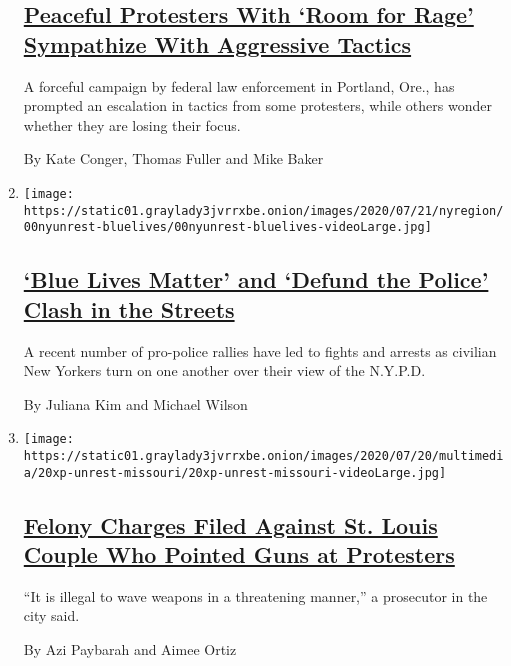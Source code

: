 \begin{enumerate}
  \hypertarget{peaceful-protesters-with-room-for-rage-sympathize-with-aggressive-tactics}{%
  \subsection{\texorpdfstring{\href{/2020/07/27/us/protests-divisions-blm.html}{Peaceful
  Protesters With `Room for Rage' Sympathize With Aggressive
  Tactics}}{Peaceful Protesters With `Room for Rage' Sympathize With Aggressive Tactics}}\label{peaceful-protesters-with-room-for-rage-sympathize-with-aggressive-tactics}}

  A forceful campaign by federal law enforcement in Portland, Ore., has
  prompted an escalation in tactics from some protesters, while others
  wonder whether they are losing their focus.

  By Kate Conger, Thomas Fuller and Mike Baker
\item
  \texttt{[image: https://static01.graylady3jvrrxbe.onion/images/2020/07/21/nyregion/00nyunrest-bluelives/00nyunrest-bluelives-videoLarge.jpg]}

  \hypertarget{blue-lives-matter-and-defund-the-police-clash-in-the-streets}{%
  \subsection{\texorpdfstring{\href{/2020/07/22/nyregion/ny-back-the-blue-lives-matter-rallies.html}{`Blue
  Lives Matter' and `Defund the Police' Clash in the
  Streets}}{`Blue Lives Matter' and `Defund the Police' Clash in the Streets}}\label{blue-lives-matter-and-defund-the-police-clash-in-the-streets}}

  A recent number of pro-police rallies have led to fights and arrests
  as civilian New Yorkers turn on one another over their view of the
  N.Y.P.D.

  By Juliana Kim and Michael Wilson
\item
  \texttt{[image: https://static01.graylady3jvrrxbe.onion/images/2020/07/20/multimedia/20xp-unrest-missouri/20xp-unrest-missouri-videoLarge.jpg]}

  \hypertarget{felony-charges-filed-against-st-louis-couple-who-pointed-guns-at-protesters}{%
  \subsection{\texorpdfstring{\href{/2020/07/20/us/mark-patricia-mccloskey-charges.html}{Felony
  Charges Filed Against St. Louis Couple Who Pointed Guns at
  Protesters}}{Felony Charges Filed Against St. Louis Couple Who Pointed Guns at Protesters}}\label{felony-charges-filed-against-st-louis-couple-who-pointed-guns-at-protesters}}

  ``It is illegal to wave weapons in a threatening manner,'' a
  prosecutor in the city said.

  By Azi Paybarah and Aimee Ortiz
\end{enumerate}

